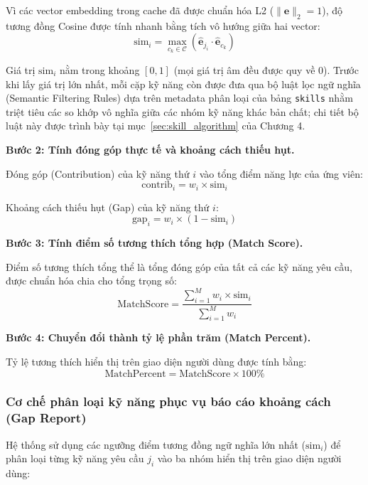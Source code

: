 Vì các vector embedding trong cache đã được chuẩn hóa L2 ($\|\mathbf{e}\|_2 = 1$), độ tương đồng Cosine được tính nhanh bằng tích vô hướng giữa hai vector:
\begin{equation}
    \text{sim}_i = \max_{c_k \in \mathcal{C}} \left( \hat{\mathbf{e}}_{j_i} \cdot \hat{\mathbf{e}}_{c_k} \right)
\end{equation}

Giá trị $\text{sim}_i$ nằm trong khoảng $[0, 1]$ (mọi giá trị âm đều được quy về $0$). Trước khi lấy giá trị lớn nhất, mỗi cặp kỹ năng còn được đưa qua bộ luật lọc ngữ nghĩa (Semantic Filtering Rules) dựa trên metadata phân loại của bảng \texttt{skills} nhằm triệt tiêu các so khớp vô nghĩa giữa các nhóm kỹ năng khác bản chất; chi tiết bộ luật này được trình bày tại mục~\ref{sec:skill_algorithm} của Chương 4.

\textbf{Bước 2: Tính đóng góp thực tế và khoảng cách thiếu hụt.}

Đóng góp (Contribution) của kỹ năng thứ $i$ vào tổng điểm năng lực của ứng viên:
\begin{equation}
    \text{contrib}_i = w_i \times \text{sim}_i
\end{equation}

Khoảng cách thiếu hụt (Gap) của kỹ năng thứ $i$:
\begin{equation}
    \text{gap}_i = w_i \times (1 - \text{sim}_i)
\end{equation}

\textbf{Bước 3: Tính điểm số tương thích tổng hợp (Match Score).}

Điểm số tương thích tổng thể là tổng đóng góp của tất cả các kỹ năng yêu cầu, được chuẩn hóa chia cho tổng trọng số:
\begin{equation}
    \text{MatchScore} = \frac{\displaystyle\sum_{i=1}^{M} w_i \times \text{sim}_i}{\displaystyle\sum_{i=1}^{M} w_i}
\end{equation}

\textbf{Bước 4: Chuyển đổi thành tỷ lệ phần trăm (Match Percent).}

Tỷ lệ tương thích hiển thị trên giao diện người dùng được tính bằng:
\begin{equation}
    \text{MatchPercent} = \text{MatchScore} \times 100\%
\end{equation}

\subsubsection*{Cơ chế phân loại kỹ năng phục vụ báo cáo khoảng cách (Gap Report)}
Hệ thống sử dụng các ngưỡng điểm tương đồng ngữ nghĩa lớn nhất ($\text{sim}_i$) để phân loại từng kỹ năng yêu cầu $j_i$ vào ba nhóm hiển thị trên giao diện người dùng:

